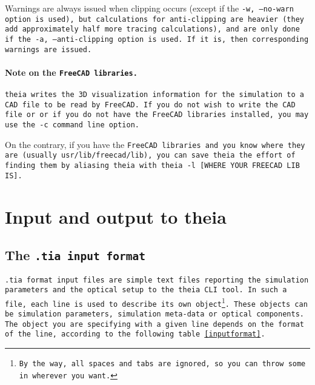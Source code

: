 \documentclass{article}
\begin{document}
Warnings are always issued when clipping occurs (except if the \tt{-w, --no-warn} option is used), but calculations for anti-clipping are heavier (they add approximately half more tracing calculations), and are only done if the \tt{-a, --anti-clipping} option is used. If it is, then corresponding warnings are issued.

\paragraph{Note on the \tt{FreeCAD} libraries.}\tt{theia} writes the 3D visualization information for the simulation to a CAD file to be read by \tt{FreeCAD}. If you do not wish to write the CAD file or or if you do not have the \tt{FreeCAD} libraries installed, you may use the \tt{-c} command line option.

On the contrary, if you have the \tt{FreeCAD} libraries and you know where they are (usually \tt{usr/lib/freecad/lib}), you can save \tt{theia} the effort of finding them by aliasing \tt{theia} with \tt{theia -l [WHERE YOUR FREECAD LIB IS]}.


\section{Input and output to theia}
\subsection{The \tt{.tia} input format}
\tt{.tia} format input files are simple text files reporting the simulation parameters and the optical setup to the \tt{theia} CLI tool. In such a file, each line is used to describe its own object\footnote{By the way, all spaces and tabs are ignored, so you can throw some in wherever you want.}. These objects can be simulation parameters, simulation meta-data or optical components. The object you are specifying with a given line depends on the format of the line, according to the following table \ref{inputformat}.
\end{document}
